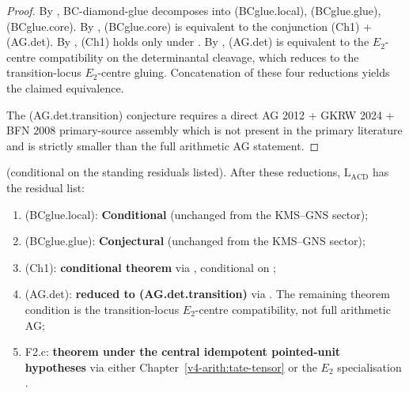 \begin{proof}
By , BC-diamond-glue
decomposes into (BCglue.local), (BCglue.glue), (BCglue.core). By
, (BCglue.core)
is equivalent to the conjunction (Ch1) + (AG.det). By
, (Ch1) holds only under
. By
,
(AG.det) is equivalent to the \(E_{2}\)-centre compatibility on the
determinantal cleavage, which
 reduces to the
transition-locus \(E_{2}\)-centre gluing. Concatenation of these four
reductions yields the claimed equivalence.

The (AG.det.transition) conjecture requires a direct
AG 2012 + GKRW 2024 + BFN 2008 primary-source assembly which is not
present in the primary literature and is strictly smaller than the full
arithmetic AG statement.
\end{proof}

\begin{corollary}
\label{v4-arith:w5-h:cor:LACD-wave5}
\ClaimStatusConjectured (conditional on the standing residuals listed).
After these reductions, \(\mathrm{L}_{\mathrm{ACD}}\) has the residual
list:
\begin{enumerate}
\item (BCglue.local): \textbf{Conditional} (unchanged from
the KMS--GNS sector);
\item (BCglue.glue): \textbf{Conjectural} (unchanged from the KMS--GNS sector);
\item (Ch1): \textbf{conditional theorem} via
, conditional on
;
\item (AG.det): \textbf{reduced to (AG.det.transition)} via
. The remaining theorem
condition is the transition-locus \(E_{2}\)-centre compatibility,
not full arithmetic AG;
\item F2.c: \textbf{theorem under the central idempotent pointed-unit
hypotheses} via either
Chapter~\ref{v4-arith:tate-tensor}
 or the \(E_{2}\) specialisation
.
\end{enumerate}
\end{corollary}

